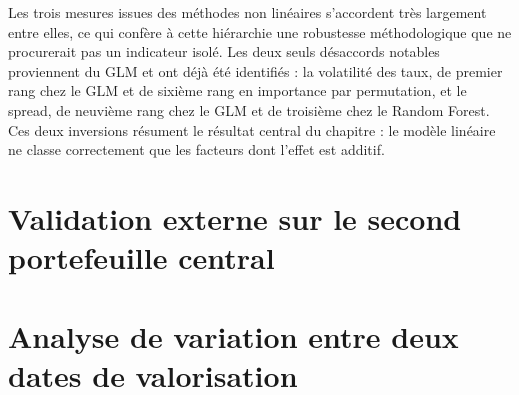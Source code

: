 Les trois mesures issues des méthodes non linéaires s'accordent très largement
entre elles, ce qui confère à cette hiérarchie une robustesse méthodologique
que ne procurerait pas un indicateur isolé. Les deux seuls désaccords notables
proviennent du GLM et ont déjà été identifiés : la volatilité des taux, de
premier rang chez le GLM et de sixième rang en importance par permutation, et
le spread, de neuvième rang chez le GLM et de troisième chez le Random Forest.
Ces deux inversions résument le résultat central du chapitre : le modèle
linéaire ne classe correctement que les facteurs dont l'effet est additif.




\section{Validation externe sur le second portefeuille central}

\section{Analyse de variation entre deux dates de valorisation}